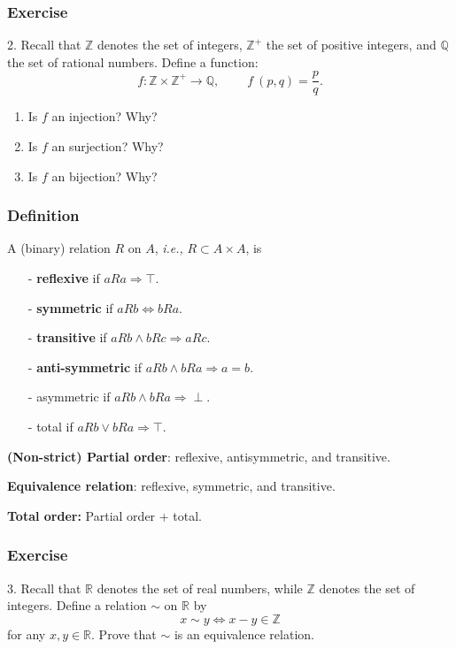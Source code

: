 \documentclass{beamer}
\begin{document}
\begin{frame}
    \frametitle{Exercise}
    2. Recall that $\mathbb{Z}$ denotes the set of integers, $\mathbb{Z}^+$ the set of positive integers, and $\mathbb{Q}$ the set of rational numbers. 
    Define a function: 
    \begin{equation*}
    f: \mathbb{Z} \times \mathbb{Z}^+ \to \mathbb{Q},~~~~~~~~~~
    f~(p,q) = \frac{p}{q}.
    \end{equation*}
    \begin{enumerate}
    	\item Is $f$ an injection? Why?
    	\item Is $f$ an surjection? Why?
    	\item Is $f$ an bijection? Why?
    \end{enumerate}
\end{frame}
\begin{frame}
    \frametitle{Definition}
    \parbox{\textwidth}{
		\par A (binary) relation $R$ on $A$, \textit{i.e.,} $R \subset A \times A$, is
		\begin{itemize}
			\item[-] \textbf{ref\mbox{l}exive} if $aRa \Rightarrow \top$.
			\item[-] \textbf{symmetric} if $aRb \Leftrightarrow bRa$.
			\item[-] \textbf{transitive} if $aRb \wedge bRc \Rightarrow aRc$.
			\item[-] \textbf{anti-symmetric} if $aRb \wedge bRa \Rightarrow a = b$.
			\item[-] asymmetric if $aRb \wedge bRa \Rightarrow \perp$.
			\item[-] total if $aRb \vee bRa \Rightarrow \top$.
		\end{itemize}
		\par \phantom{ji}
		\par \textbf{(Non-strict) Partial order}: reflexive, antisymmetric, and transitive.
		\par \textbf{Equivalence relation}: reflexive, symmetric, and transitive.
        \par \textbf{Total order:} Partial order + total.
    }
\end{frame}
\begin{frame}
    \frametitle{Exercise}
    3. Recall that $\mathbb{R}$ denotes the set of real numbers, while $\mathbb{Z}$ denotes the set of integers. Define a relation $\sim$ on $\mathbb{R}$ by
    \begin{equation*}
        x \sim y \Leftrightarrow x - y \in \mathbb{Z}
    \end{equation*}
    for any $x, y \in \mathbb{R}$. Prove that $\sim$ is an equivalence relation.
\end{frame}
\end{document}
